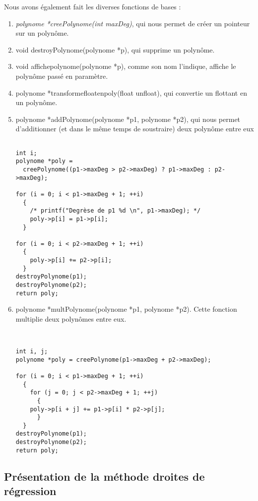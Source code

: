 \documentclass[letter]{article}
\begin{document}
Nous avons également fait les diverses fonctions de bases :
\begin{enumerate}
\item \emph{polynome *creePolynome(int maxDeg)}, qui nous permet de créer un pointeur sur un polynôme.
\item void destroyPolynome(polynome *p), qui supprime un polynôme.
\item void affichepolynome(polynome *p), comme son nom l'indique, affiche le polynôme passé en paramètre.
\item polynome *transformefloatenpoly(float unfloat), qui convertie un flottant en un polynôme.
\item polynome *addPolynome(polynome *p1, polynome *p2), qui nous permet d'additionner (et dans le même temps de soustraire) deux polynôme entre eux

\begin{verbatim}

int i;
polynome *poly =
  creePolynome((p1->maxDeg > p2->maxDeg) ? p1->maxDeg : p2->maxDeg);

for (i = 0; i < p1->maxDeg + 1; ++i)
  {
    /* printf("Degrèse de p1 %d \n", p1->maxDeg); */
    poly->p[i] = p1->p[i];
  }

for (i = 0; i < p2->maxDeg + 1; ++i)
  {
    poly->p[i] += p2->p[i];
  }
destroyPolynome(p1);
destroyPolynome(p2);
return poly;

\end{verbatim}
\item polynome *multPolynome(polynome *p1, polynome *p2). Cette fonction multiplie deux polynômes entre eux.

\begin{verbatim}


int i, j;
polynome *poly = creePolynome(p1->maxDeg + p2->maxDeg);

for (i = 0; i < p1->maxDeg + 1; ++i)
  {
    for (j = 0; j < p2->maxDeg + 1; ++j)
      {
	poly->p[i + j] += p1->p[i] * p2->p[j];
      }
  }
destroyPolynome(p1);
destroyPolynome(p2);
return poly;

\end{verbatim}
\end{enumerate}








\subsection{Présentation de la méthode droites de régression}
\label{sec:orgab84bf4}
\end{document}
